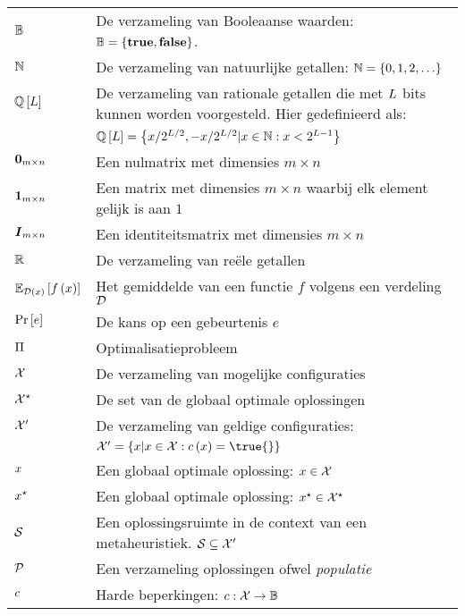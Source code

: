 \begin{flushleft}
  \renewcommand{\arraystretch}{1.1}
  \begin{tabularx}{\textwidth}{@{}p{20mm}X@{}}
    $\BoolSet$							& De verzameling van Booleaanse waarden: $\BoolSet=\accl{\mbox{\textbf{true}},\mbox{\textbf{false}}}$. \\
    $\NatSet$							& De verzameling van natuurlijke getallen: $\NatSet=\accl{0,1,2,\ldots}$ \\
    $\QbitSet{\bitvar}$					& De verzameling van rationale getallen die met $\bitvar$ bits kunnen worden voorgesteld. Hier gedefinieerd als:\\ &$\QbitSet{\bitvar}=\accl{x/2^{\bitvar/2},-x/2^{\bitvar/2}|x\in\NatSet:x<2^{\bitvar-1}}$ \\
    $\zeromatrix[m\times n]$			& Een nulmatrix met dimensies $m\times n$\\
    $\onematrix[m\times n]$				& Een matrix met dimensies $m\times n$ waarbij elk element gelijk is aan $1$\\
    $\identitymatrix[m\times n]$		& Een identiteitsmatrix met dimensies $m\times n$\\
    $\RealSet$							& De verzameling van re\"ele getallen\\
    $\mean[\fun{\calD}{x}]{\fun{f}{x}}$	& Het gemiddelde van een functie $f$ volgens een verdeling $\calD$\\
    $\Prob{e}$							& De kans op een gebeurtenis $e$\\
    $\OpProblem$						& Optimalisatieprobleem\\
    $\ConfigSet$						& De verzameling van mogelijke configuraties\\
    $\ConfigOpSet$						& De set van de globaal optimale oplossingen\\
    $\ConfigValSet$						& De verzameling van geldige configuraties:\\
										& $\ConfigValSet=\accl{x|x\in\ConfigSet:\fun{c}{x}=\true{}}$\\
    $\sol$								& Een globaal optimale oplossing: $\sol\in\ConfigSet$\\
    $\bestSol$							& Een globaal optimale oplossing: $\xstar\in\ConfigOpSet$\\
    $\SolSet$							& Een oplossingsruimte in de context van een metaheuristiek. $\SolSet\subseteq\ConfigValSet$\\
    $\PopSet$							& Een verzameling oplossingen ofwel \emph{populatie}\\
    $\hcfun$							& Harde beperkingen: $\funsig{\hcfun}{\ConfigSet}{\BoolSet}$\\

\end{tabularx}
\end{flushleft}
